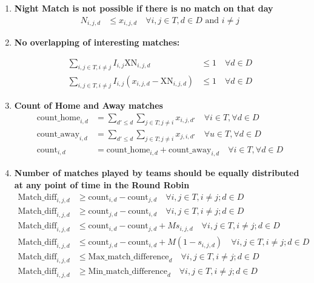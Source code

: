 \documentclass[a4paper, 12pt]{article}
\begin{document}
\begin{enumerate}
    \item \textbf{Night Match is not possible if there is no match on that day}
    \begin{align*}
        N_{i,j,d} &\leq x_{i,j,d} \quad \forall i,j \in T, d \in D \text{ and } i \neq j
    \end{align*}

    \item \textbf{No overlapping of interesting matches:}
    
    \begin{align*}
        \sum_{i,j \in T, i \neq j} I_{i,j} \text{XN}_{i,j,d} &\leq 1 \quad \forall d \in D \\
        \sum_{i,j \in T, i \neq j} I_{i,j} (x_{i,j,d} - \text{XN}_{i,j,d}) &\leq 1 \quad \forall d \in D
    \end{align*}

    \item \textbf{Count of Home and Away matches}
    \begin{align*}
        \text{count\_home}_{i,d} &= \sum_{d' \leq d} \sum_{j \in T; j \neq i} x_{i,j,d'} \quad \forall i \in T , \forall d \in D \\
        \text{count\_away}_{i,d} &= \sum_{d' \leq d} \sum_{j \in T; j \neq i} x_{j,i,d'} \quad \forall u \in T, \forall d \in D \\
        \text{count}_{i,d} &= \text{count\_home}_{i,d} + \text{count\_away}_{i,d} \quad \forall i \in T, \forall d \in D
    \end{align*}

    \item \textbf{Number of matches played by teams should be equally distributed at any point of time in the Round Robin}
    \begin{align*}
    \text{Match\_diff}_{i,j,d} &\geq \text{count}_{i,d} - \text{count}_{j,d} \quad \forall i,j \in T, i \neq j; d \in D\\
    \text{Match\_diff}_{i,j,d} &\geq \text{count}_{j,d} - \text{count}_{i,d}\quad \forall i,j \in T, i \neq j; d \in D\\
    \text{Match\_diff}_{i,j,d} &\leq \text{count}_{i,d} - \text{count}_{j,d} + M s_{i,j,d} \quad \forall i,j \in T, i \neq j; d \in D\\
    \text{Match\_diff}_{i,j,d} &\leq \text{count}_{j,d} - \text{count}_{i,d} + M (1 - s_{i,j,d}) \quad \forall i,j \in T, i \neq j; d \in D\\
    \text{Match\_diff}_{i,j,d} &\leq \text{Max\_match\_difference}_{d} \quad \forall i,j \in T, i \neq j; d \in D\\
    \text{Match\_diff}_{i,j,d} &\geq \text{Min\_match\_difference}_{d} \quad \forall i,j \in T, i \neq j; d \in D
    \end{align*}


\end{enumerate}
\end{document}
